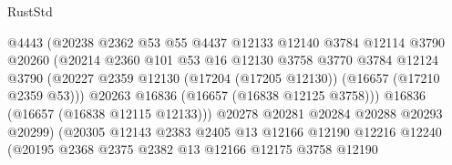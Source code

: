 \begin{lexlean}{RustStd}
\begin{coremodule}
                                    @4443
                                    (@20238
                                      @2362
                                      @53
                                      @55
                                      @4437
                                      @12133
                                      @12140
                                      @3784
                                      @12114
                                      @3790
                                      @20260
                                      (@20214
                                        @2360
                                        @101
                                        @53
                                        @16
                                        @12130
                                        @3758
                                        @3770
                                        @3784
                                        @12124
                                        @3790
                                        (@20227
                                          @2359
                                          @12130
                                          (@17204 (@17205 @12130))
                                          (@16657 (@17210 @2359 @53)))
                                        @20263
                                        @16836
                                        (@16657 (@16838 @12125 @3758)))
                                      @16836
                                      (@16657 (@16838 @12115 @12133)))
                                    @20278
                                    @20281
                                    @20284
                                    @20288
                                    @20293
                                    @20299)
                                  (@20305
                                    @12143
                                    @2383
                                    @2405
                                    @13
                                    @12166
                                    @12190
                                    @12216
                                    @12240
                                    (@20195
                                      @2368
                                      @2375
                                      @2382
                                      @13
                                      @12166
                                      @12175
                                      @3758
                                      @12190

\end{coremodule}
\end{lexlean}
